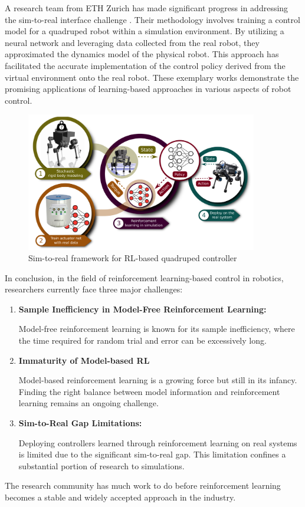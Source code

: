 A research team from ETH Zurich has made significant progress in addressing the sim-to-real interface challenge \cite{hwangbo2019learning}. Their methodology involves training a control model for a quadruped robot within a simulation environment. By utilizing a neural network and leveraging data collected from the real robot, they approximated the dynamics model of the physical robot. This approach has facilitated the accurate implementation of the control policy derived from the virtual environment onto the real robot. These exemplary works demonstrate the promising applications of learning-based approaches in various aspects of robot control.

\begin{figure}[H]
  \centering
  \includegraphics[width=0.9\textwidth]{figures/quadruped_sim2real.png} %
  \caption{Sim-to-real framework for RL-based quadruped controller\cite{hwangbo2019learning}}
  \label{fig:benchmarking MBRL}
\end{figure}

In conclusion, in the field of reinforcement learning-based control in robotics, researchers currently face three major challenges:

\begin{enumerate}
    \item \textbf{Sample Inefficiency in Model-Free Reinforcement Learning:}
    
    Model-free reinforcement learning is known for its sample inefficiency, where the time required for random trial and error can be excessively long.
    
    \item \textbf{Immaturity of Model-based RL} 
    
    Model-based reinforcement learning is a growing force but still in its infancy. Finding the right balance between model information and reinforcement learning remains an ongoing challenge.
    
    \item \textbf{Sim-to-Real Gap Limitations:} 
    
    Deploying controllers learned through reinforcement learning on real systems is limited due to the significant sim-to-real gap. This limitation confines a substantial portion of research to simulations.
\end{enumerate}

The research community has much work to do before reinforcement learning becomes a stable and widely accepted approach in the industry.


\cleardoublepage
